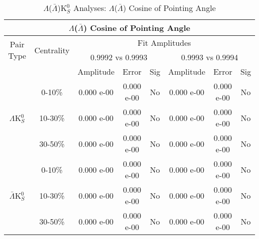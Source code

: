 \documentclass[../AnalysisNoteJBuxton.tex]{subfiles}
\begin{document}
\begin{table}
 \centering
 \begin{tabular}{|c|c|c|c|c||c|c|c|}
  \multicolumn{8}{c}{$\Lambda$($\bar{\Lambda}$) Cosine of Pointing Angle} \\
  \hline
  \multirow{2}{*}{Pair Type} & \multirow{2}{*}{Centrality} & \multicolumn{6}{c|}{Fit Amplitudes} \\
  \cline{3-8}
   & & \multicolumn{3}{c||}{0.9992 vs 0.9993} & \multicolumn{3}{c|}{0.9993 vs 0.9994} \\
  \hline
   & & Amplitude & Error & Sig & Amplitude & Error & Sig \\
  \hline  
  \multirow{3}{*}{$\Lambda$K$^{0}_{S}$}  
   &  0-10\% & 0.000 e-00 & 0.000 e-00 & No & 0.000 e-00 & 0.000 e-00 & No \\
   & 10-30\% & 0.000 e-00 & 0.000 e-00 & No & 0.000 e-00 & 0.000 e-00 & No \\
   & 30-50\% & 0.000 e-00 & 0.000 e-00 & No & 0.000 e-00 & 0.000 e-00 & No \\
  \hline  
  \multirow{3}{*}{$\bar{\Lambda}$K$^{0}_{S}$}  
   &  0-10\% & 0.000 e-00 & 0.000 e-00 & No & 0.000 e-00 & 0.000 e-00 & No \\
   & 10-30\% & 0.000 e-00 & 0.000 e-00 & No & 0.000 e-00 & 0.000 e-00 & No \\
   & 30-50\% & 0.000 e-00 & 0.000 e-00 & No & 0.000 e-00 & 0.000 e-00 & No \\
  \hline
 \end{tabular}
 \caption{$\Lambda$($\bar{\Lambda}$)K$^{0}_{S}$ Analyses: $\Lambda$($\bar{\Lambda}$) Cosine of Pointing Angle}
 \label{tab:LamCosPointingAngleLamK0}
\end{table}
\end{document}
